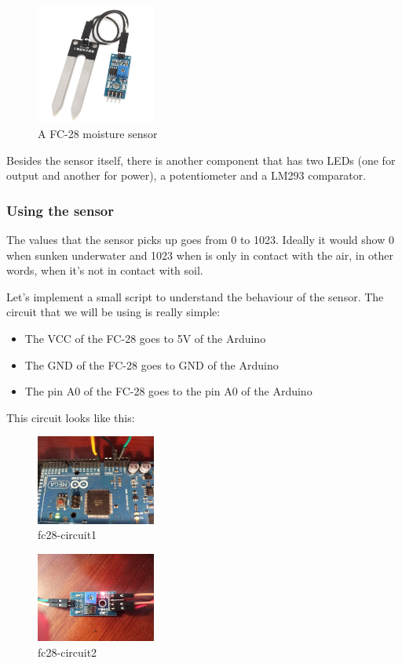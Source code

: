 \begin{figure}[htp]
    \centering
    \includegraphics[width=0.35\textwidth]{fig/fc28.jpg}
    \caption{A FC-28 moisture sensor}
    \label{fig:fc28}
\end{figure}

Besides the sensor itself, there is another component that has two LEDs (one for output and another for power), a potentiometer and a LM293 comparator.

\subsubsection{Using the sensor}
The values that the sensor picks up goes from 0 to 1023. Ideally it would show 0 when sunken underwater and 1023 when is only in contact with the air, in other words, when it's not in contact with soil.

Let's implement a small script to understand the behaviour of the sensor. The circuit that we will be using is really simple:
\begin{itemize}
	\item The VCC of the FC-28 goes to 5V of the Arduino
	\item The GND of the FC-28 goes to GND of the Arduino
	\item The pin A0 of the FC-28 goes to the pin A0 of the Arduino
\end{itemize}
This circuit looks like this:
	\begin{figure}[htp]
		\centering
		\includegraphics[width=0.35\textwidth]{fig/fc28-circuit1.jpg}
		\caption{fc28-circuit1}
	\end{figure}
	\hfill
	\begin{figure}[htp]
		\centering
		\includegraphics[width=0.35\textwidth]{fig/fc28-circuit2.jpg}
		\caption{fc28-circuit2}
	\end{figure}


